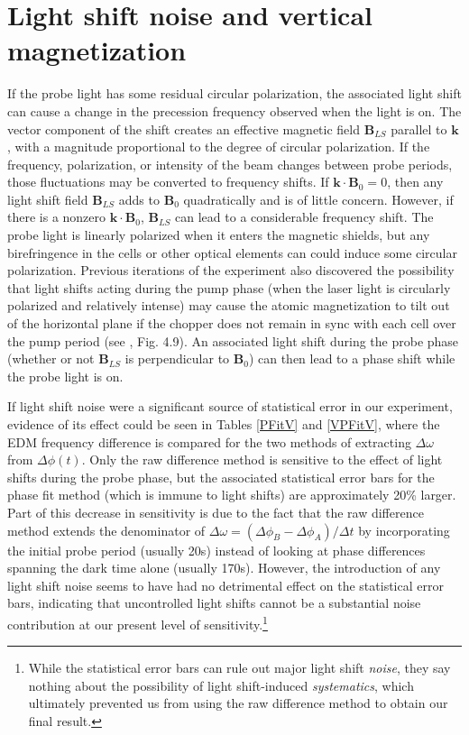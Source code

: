 \documentclass [10pt, twoside] {uwthesis}[2012/04/02]
\begin{document}
\section{Light shift noise and vertical magnetization}\label{light_shift_noise} 
If the probe light has some residual circular polarization, the associated light shift can cause a change in the precession frequency observed when the light is on. The vector component of the shift creates an effective magnetic field $\mathbf{B}_{LS}$ parallel to $\mathbf{k}$, with a magnitude proportional to the degree of circular polarization. If the frequency, polarization, or intensity of the beam changes between probe periods, those fluctuations may be converted to frequency shifts. If $\mathbf{k} \cdot \mathbf{B}_0 = 0$, then any light shift field $\mathbf{B}_{LS}$ adds to $\mathbf{B}_0$ quadratically and is of little concern. However, if there is a nonzero $\mathbf{k} \cdot \mathbf{B}_0$, $\mathbf{B}_{LS}$ can lead to a considerable frequency shift. The probe light is linearly polarized when it enters the magnetic shields, but any birefringence in the cells or other optical elements can could induce some circular polarization. Previous iterations of the experiment also discovered the possibility that light shifts acting during the pump phase (when the laser light is circularly polarized and relatively intense) may cause the atomic magnetization to tilt out of the horizontal plane if the chopper does not remain in sync with each cell over the pump period (see \cite{Swallows}, Fig. 4.9). An associated light shift during the probe phase (whether or not $\mathbf{B}_{LS}$ is perpendicular to $\mathbf{B}_0$) can then lead to a phase shift while the probe light is on. 

If light shift noise were a significant source of statistical error in our experiment, evidence of its effect could be seen in Tables \ref{PFitV} and \ref{VPFitV}, where the EDM frequency difference is compared for the two methods of extracting $\Delta\omega$ from $\Delta\phi(t)$. Only the raw difference method is sensitive to the effect of light shifts during the probe phase, but the associated statistical error bars for the phase fit method (which is immune to light shifts) are approximately 20\% larger. Part of this decrease in sensitivity is due to the fact that the raw difference method extends the denominator of $\Delta\omega = (\Delta\phi_B - \Delta\phi_A)/\Delta t$ by incorporating the initial probe period (usually 20s) instead of looking at phase differences spanning the dark time alone (usually 170s). However, the introduction of any light shift noise seems to have had no detrimental effect on the statistical error bars, indicating that uncontrolled light shifts cannot be a substantial noise contribution at our present level of sensitivity.\footnote{While the statistical error bars can rule out major light shift \textit{noise}, they say nothing about the possibility of light shift-induced \textit{systematics}, which ultimately prevented us from using the raw difference method to obtain our final result.}
\end{document}
